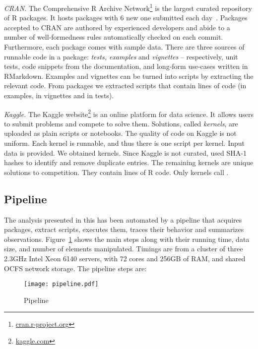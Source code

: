 \documentclass[screen,acmsmall]{acmart}
\newcommand{\mypara}[1]{\medskip\noindent\emph{#1}\xspace}
\begin{document}
\mypara{CRAN.} The Comprehensive R Archive
Network\footnote{\url{cran.r-project.org}} is the largest curated repository of
R packages. It hosts \CranAvailablePackagesRnd packages with 6 new one submitted
each day~\cite{Ligges2017}. Packages accepted to CRAN are authored by
experienced developers and abide to a number of well-formedness rules
automatically checked on each commit. Furthermore, each package comes with
sample data. There are three sources of runnable code in a package: \emph{tests,
examples} and \emph{vignettes} -- respectively, unit tests, code snippets from
the documentation, and long-form use-cases written in RMarkdown.
Examples and vignettes can be turned into scripts by extracting the relevant
code. From \CranPackages packages we extracted \CranRunnableScripts scripts that contain
\CranRunnableCode lines of code (\CranRunnableCodeExamplesRnd in examples,
\CranRunnableCodeVignettesRnd in vignettes and \CranRunnableCodeTestsRnd in
tests).

\mypara{Kaggle.} The Kaggle website\footnote{\url{kaggle.com}} is an online
platform for data science. It allows users to submit problems and compete to
solve them. Solutions, called \emph{kernels}, are uploaded as plain scripts or
notebooks. The quality of code on Kaggle is not uniform. Each kernel is
runnable, and thus there is one script per kernel. Input data is provided. We
obtained \KaggleKernels kernels. Since Kaggle is not curated, used SHA-1 hashes
to identify and remove \KaggleDuplicates duplicate entries. The remaining
\KaggleUnique kernels are unique solutions to \KaggleCompetitions competition.
They contain \KaggleCode lines of R code. Only \KaggleWithEvals kernels call
\eval.

\subsection{Pipeline}

The analysis presented in this has been automated by a pipeline that acquires
packages, extract scripts, executes them, traces their behavior and summarizes
observations. Figure~\ref{fig:pipeline} shows the main steps along with their
running time, data size, and number of elements manipulated. Timings are from a
cluster of three 2.3GHz Intel Xeon 6140 servers, with 72 cores and 256GB of RAM,
and shared OCFS network storage. The pipeline steps are:


\begin{figure}[!h]\hspace{-5mm}
  \texttt{[image: pipeline.pdf]}
  \caption{Pipeline}\label{fig:pipeline}
\end{figure}
\end{document}
